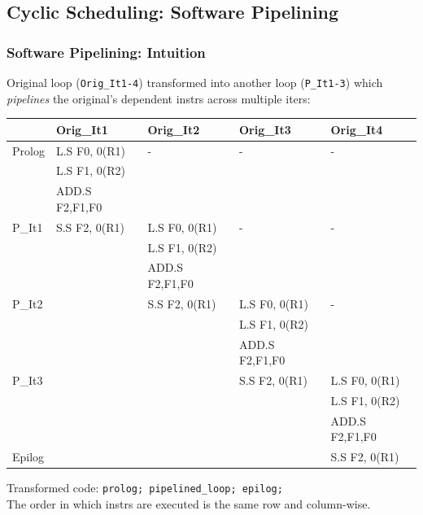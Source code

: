 \documentclass{beamer}
\begin{document}
\subsection{Cyclic Scheduling: Software Pipelining}

\begin{frame}[fragile,t]
    \frametitle{Software Pipelining: Intuition}

Original loop ({\tt Orig\_It1-4}) transformed into another loop ({\tt P\_It1-3})
which {\em pipelines} the original's dependent instrs across multiple iters:

\bigskip

\begin{scriptsize}
\begin{tabular}{lllll}
\hline
        & Orig\_It1       & Orig\_It2      & Orig\_It3 & Orig\_It4 \\\hline
Prolog  & L.S F0, 0(R1)   & -               & -     & - \\
        & L.S F1, 0(R2)   &                 &       &   \\
        & ADD.S F2,F1,F0  &                 &       &   \\\hline
P\_It1  & S.S F2, 0(R1)   & L.S F0, 0(R1)   & -     & - \\
        &                 & L.S F1, 0(R2)   &       &    \\
        &                 & ADD.S F2,F1,F0  &       &    \\\hline
P\_It2  &                 & S.S F2, 0(R1)   & L.S F0, 0(R1)   & - \\
        &                 &                 & L.S F1, 0(R2)   &   \\
        &                 &                 & ADD.S F2,F1,F0  &   \\\hline
P\_It3  &                 &                 & S.S F2, 0(R1)   & L.S F0, 0(R1)  \\
        &                 &                 &                 & L.S F1, 0(R2)  \\
        &                 &                 &                 & ADD.S F2,F1,F0 \\\hline
Epilog  &                 &                 &                 & S.S F2, 0(R1)  \\\hline

\end{tabular}
\end{scriptsize}

Transformed code: {\tt prolog; pipelined\_loop; epilog;}\\
The order in which instrs are executed is the same row and column-wise.

\end{frame}
\end{document}

